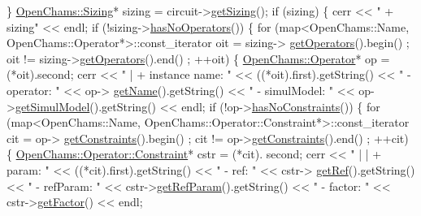 \begin{DoxyCodeInclude}
    \}
    \mbox{\hyperlink{class_open_chams_1_1_sizing}{OpenChams::Sizing}}* sizing = circuit->\mbox{\hyperlink{class_open_chams_1_1_circuit_a0ce52bc8747f684ec0123faa8ff97b6d}{getSizing}}();
    \textcolor{keywordflow}{if} (sizing) \{
        cerr << \textcolor{stringliteral}{" + sizing"} << endl;
        \textcolor{keywordflow}{if} (!sizing->\mbox{\hyperlink{class_open_chams_1_1_sizing_ac8a299add4fd32ff8bf99c889f4a79a6}{hasNoOperators}}()) \{
            \textcolor{keywordflow}{for} (map<OpenChams::Name, OpenChams::Operator*>::const\_iterator oit = sizing->
      \mbox{\hyperlink{class_open_chams_1_1_sizing_ad35c9083b30dac45186f4f0eb49b435d}{getOperators}}().begin() ; oit != sizing->\mbox{\hyperlink{class_open_chams_1_1_sizing_ad35c9083b30dac45186f4f0eb49b435d}{getOperators}}().end() ; ++oit) \{
                \mbox{\hyperlink{class_open_chams_1_1_operator}{OpenChams::Operator}}* op = (*oit).second;
                cerr << \textcolor{stringliteral}{" | + instance name: "} << ((*oit).first).getString() << \textcolor{stringliteral}{" - operator: "} << op->
      \mbox{\hyperlink{class_open_chams_1_1_operator_a2858c0c4e8b5108f041237cf5a802029}{getName}}().getString() << \textcolor{stringliteral}{" - simulModel: "} << op->\mbox{\hyperlink{class_open_chams_1_1_operator_aa189a1b119b44a8877c478e2d2357a89}{getSimulModel}}().getString() << endl;
                \textcolor{keywordflow}{if} (!op->\mbox{\hyperlink{class_open_chams_1_1_operator_a9ac68ad3e43b1649a8582c8685f4886d}{hasNoConstraints}}()) \{
                    \textcolor{keywordflow}{for} (map<OpenChams::Name, OpenChams::Operator::Constraint*>::const\_iterator cit = op->
      \mbox{\hyperlink{class_open_chams_1_1_operator_a0002889b395185948d7c71b261343620}{getConstraints}}().begin() ; cit != op->\mbox{\hyperlink{class_open_chams_1_1_operator_a0002889b395185948d7c71b261343620}{getConstraints}}().end() ; ++cit) \{
                        \mbox{\hyperlink{class_open_chams_1_1_operator_1_1_constraint}{OpenChams::Operator::Constraint}}* cstr = (*cit).
      second;
                        cerr << \textcolor{stringliteral}{" | | + param: "} << ((*cit).first).getString() << \textcolor{stringliteral}{" - ref: "} << cstr->
      \mbox{\hyperlink{class_open_chams_1_1_operator_1_1_constraint_a07cf74adaf661f0aaaa1818d24c2243d}{getRef}}().getString() << \textcolor{stringliteral}{" - refParam: "} << cstr->\mbox{\hyperlink{class_open_chams_1_1_operator_1_1_constraint_a621539b1a4f31053649031c8034b0bd3}{getRefParam}}().getString() << \textcolor{stringliteral}{" - factor: 
      "} << cstr->\mbox{\hyperlink{class_open_chams_1_1_operator_1_1_constraint_a973fc85365f2d3f07007d88a90d7ab1d}{getFactor}}() << endl;

\end{DoxyCodeInclude}
